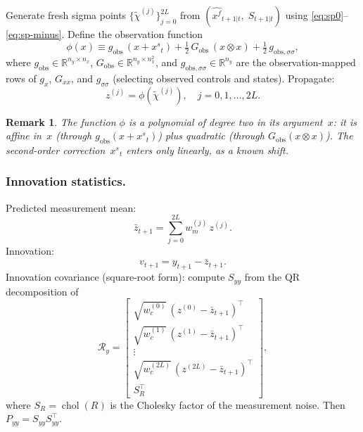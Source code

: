 \documentclass[12pt,a4paper]{article}
\newtheorem{remark}[theorem]{Remark}
\newcommand{\R}{\mathbb{R}}
\newcommand{\kron}{\otimes}
\newcommand{\xf}{{x^{f}}}
\newcommand{\xs}{{x^{s}}}
\newcommand{\gx}{g_x}
\newcommand{\Gxx}{G_{xx}}
\newcommand{\gss}{{g_{\sigma\sigma}}}
\DeclareMathOperator{\chol}{chol}
\begin{document}
Generate fresh sigma points $\{\tilde{\chi}^{(j)}\}_{j=0}^{2L}$ from
$(\hat{\xf}_{t+1|t},\;S_{t+1|t})$ using
\eqref{eq:sp0}--\eqref{eq:sp-minus}. Define the observation function
\begin{equation}\label{eq:obs-fn}
\phi(x) \equiv
  g_{\text{obs}}\,(x + \xs_t)
  + \tfrac{1}{2}\,G_{\text{obs}}\,(x \kron x)
  + \tfrac{1}{2}\,g_{\text{obs},\sigma\sigma},
\end{equation}
where $g_{\text{obs}} \in \R^{n_y \times n_x}$,
$G_{\text{obs}} \in \R^{n_y \times n_x^2}$, and
$g_{\text{obs},\sigma\sigma} \in \R^{n_y}$ are the observation-mapped
rows of $\gx$, $\Gxx$, and $\gss$ (selecting observed controls and
states). Propagate:
\begin{equation}\label{eq:obs-prop}
z^{(j)} = \phi(\tilde{\chi}^{(j)}),
\quad j = 0, 1, \ldots, 2L.
\end{equation}

\begin{remark}\label{rem:quad}
The function $\phi$ is a polynomial of degree two in its
argument~$x$: it is affine in~$x$ (through $g_{\text{obs}}(x + \xs_t)$)
plus quadratic (through $G_{\text{obs}}(x \kron x)$). The second-order
correction~$\xs_t$ enters only linearly, as a known shift.
\end{remark}

\subsubsection{Innovation statistics.}

Predicted measurement mean:
\begin{equation}\label{eq:z-bar}
\bar{z}_{t+1} = \sum_{j=0}^{2L} w_m^{(j)}\,z^{(j)}.
\end{equation}
Innovation:
\begin{equation}
v_{t+1} = y_{t+1} - \bar{z}_{t+1}.
\end{equation}
Innovation covariance (square-root form): compute $S_{yy}$ from the
QR decomposition of
\begin{equation}\label{eq:qr-obs}
\mathcal{R}_y =
\begin{bmatrix}
\sqrt{w_c^{(0)}}\,(z^{(0)} - \bar{z}_{t+1})^\top \\
\sqrt{w_c^{(1)}}\,(z^{(1)} - \bar{z}_{t+1})^\top \\
\vdots \\
\sqrt{w_c^{(2L)}}\,(z^{(2L)} - \bar{z}_{t+1})^\top \\
S_R^\top
\end{bmatrix},
\end{equation}
where $S_R = \chol(R)$ is the Cholesky factor of the measurement noise.
Then $P_{yy} = S_{yy} S_{yy}^\top$.
\end{document}

